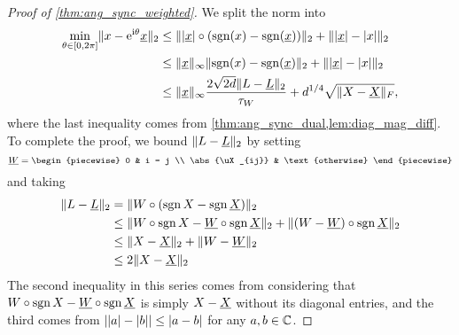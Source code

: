 \begin{proof}[Proof of \cref{thm:ang_sync_weighted}]
  We split the norm into
  \begin{align*}
    \min_{\theta \in [0, 2\pi]} \lVert x - \mathrm{e}^{\mathrm{i} \theta} \underline{x}\rVert_2 &\le \lVert\lvert\underline{x}\rvert \circ (\operatorname{sgn}(x) - \operatorname{sgn}(\underline{x}))\rVert_2 + \lVert\lvert\underline{x}\rvert - \lvert x\rvert\rVert_2 \\
    &\le \lVert\underline{x}\rVert_\infty \lVert\operatorname{sgn}(x) - \operatorname{sgn}(\underline{x})\rVert_2 + \lVert\lvert\underline{x}\rvert - \lvert x\rvert\rVert_2 \\
    &\le \lVert\underline{x}\rVert_\infty \dfrac{2 \sqrt{2d} \lVert L - \underline{L}\rVert_2}{\tau_W} + d^{1 / 4} \sqrt{\lVert X - \underline{X}\rVert_F},
  \end{align*}
  where the last inequality comes from \cref{thm:ang_sync_dual,lem:diag_mag_diff}.  To complete the proof, we bound $\lVert L - \underline{L}\rVert_2$ by setting \[\uW = \begin{piecewise} 0 & i = j \\ \abs{\uX_{ij}} & \text{otherwise} \end{piecewise}\] and taking
  \begin{align*}
    \lVert L - \underline{L}\rVert_2 &= \lVert W \circ(\operatorname{sgn} X - \operatorname{sgn} \underline{X})\rVert_2 \\
    &\le \lVert W \circ \operatorname{sgn} X - \underline{W} \circ \operatorname{sgn} \underline{X}\rVert_2 + \lVert(W - \underline{W}) \circ \operatorname{sgn} \underline{X}\rVert_2 \\
    &\le \lVert X - \underline{X}\rVert_2 + \lVert W - \underline{W}\rVert_2 \\
    &\le 2 \lVert X - \underline{X}\rVert_2
  \end{align*}
  The second inequality in this series comes from considering that $W \circ \operatorname{sgn} X - \underline{W} \circ \operatorname{sgn} \underline{X}$ is simply $X - \underline{X}$ without its diagonal entries, and the third comes from $\lvert\lvert a\rvert - \lvert b\rvert\rvert \le \lvert a - b\rvert$ for any $a, b \in \mathbb{C}$.
\end{proof}

